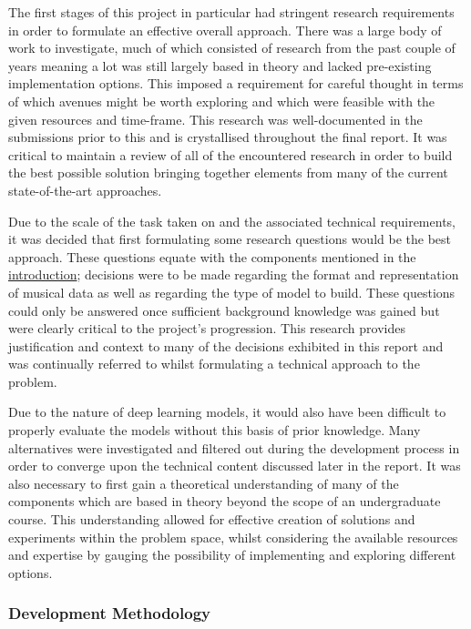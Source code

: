 \documentclass[12pt,]{article}
\begin{document}
The first stages of this project in particular had stringent research
requirements in order to formulate an effective overall approach. There
was a large body of work to investigate, much of which consisted of
research from the past couple of years meaning a lot was still largely
based in theory and lacked pre-existing implementation options. This
imposed a requirement for careful thought in terms of which avenues
might be worth exploring and which were feasible with the given
resources and time-frame. This research was well-documented in the
submissions prior to this and is crystallised throughout the final
report. It was critical to maintain a review of all of the encountered
research in order to build the best possible solution bringing together
elements from many of the current state-of-the-art approaches.

Due to the scale of the task taken on and the associated technical
requirements, it was decided that first formulating some research
questions would be the best approach. These questions equate with the
components mentioned in the
\protect\hyperlink{introduction}{introduction}; decisions were to be
made regarding the format and representation of musical data as well as
regarding the type of model to build. These questions could only be
answered once sufficient background knowledge was gained but were
clearly critical to the project's progression. This research provides
justification and context to many of the decisions exhibited in this
report and was continually referred to whilst formulating a technical
approach to the problem.

Due to the nature of deep learning models, it would also have been
difficult to properly evaluate the models without this basis of prior
knowledge. Many alternatives were investigated and filtered out during
the development process in order to converge upon the technical content
discussed later in the report. It was also necessary to first gain a
theoretical understanding of many of the components which are based in
theory beyond the scope of an undergraduate course. This understanding
allowed for effective creation of solutions and experiments within the
problem space, whilst considering the available resources and expertise
by gauging the possibility of implementing and exploring different
options.

\hypertarget{development-methodology}{%
\subsubsection{Development Methodology}\label{development-methodology}}
\end{document}
